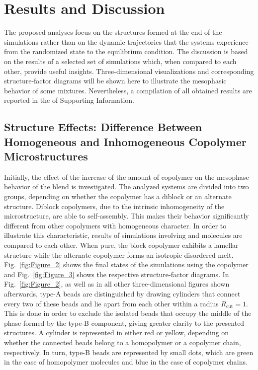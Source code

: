 \documentclass[
journal=mamobx,
manuscript=article,
]{achemso}
\begin{document}
\section{Results and Discussion}
\label{sec:results and discussion}


The proposed analyses focus on the structures formed at the end of the simulations rather than on the dynamic trajectories that the systems experience from the randomized state to the equilibrium condition.
The discussion is based on the results of a selected set of simulations which, when compared to each other, provide useful insights.
Three-dimensional visualizations and corresponding structure-factor diagrams will be shown here to illustrate the mesophasic behavior of some mixtures.
Nevertheless, a compilation of all obtained results are reported in the of Supporting Information.

\subsection{Structure Effects: Difference Between Homogeneous and Inhomogeneous Copolymer Microstructures}

Initially, the effect of the increase of the amount of copolymer on the mesophase behavior of the blend is investigated.
The analyzed systems are divided into two groups, depending on whether the copolymer has a diblock or an alternate structure.
Diblock copolymers, due to the intrinsic inhomogeneity of the microstructure, are able to self-assembly.
This makes their behavior significantly different from other copolymers with homogeneous character.
In order to illustrate this characteristic, results of simulations involving  and  molecules are compared to each other.
When pure, the block copolymer exhibits a lamellar structure while the alternate copolymer forms an isotropic disordered melt.
Fig.~\ref{fig:Figure_2} shows the final states of the simulations using the  copolymer and Fig.~\ref{fig:Figure_3} shows the respective structure-factor diagrams.
In Fig.~\ref{fig:Figure_2}, as well as in all other three-dimensional figures shown afterwards, type-A beads are distinguished by drawing cylinders that connect every two of these beads and lie apart from each other within a radius $R_\mathrm{cut}=1$.
This is done in order to exclude the isolated beads that occupy the middle of the phase formed by the type-B component, giving greater clarity to the presented structures.
A cylinder is represented in either red or yellow, depending on whether the connected beads belong to a homopolymer or a copolymer chain, respectively.
In turn, type-B beads are represented by small dots, which are green in the case of homopolymer molecules and blue in the case of copolymer chains.
\end{document}
